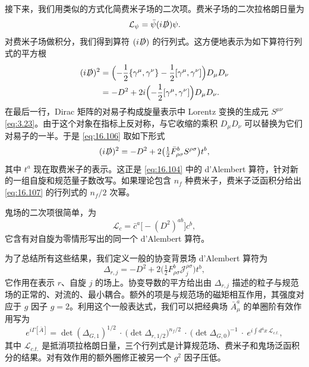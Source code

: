 接下来，我们用类似的方式化简费米子场的二次项。费米子场的二次拉格朗日量为
\begin{equation}
  \mathcal{L}_\psi = \bar{\psi}(i\slashed{D})\psi .
  \label{eq:16.105}
\end{equation}
对费米子场做积分，我们得到算符 $(i\slashed{D})$ 的行列式。这方便地表示为如下算符行列式的平方根
\begin{equation}
  \begin{aligned}
    (i\slashed{D})^2 &= \Bigl( -\frac{1}{2}\{ \gamma^\mu, \gamma^\nu \}
      - \frac{1}{2}[\gamma^\mu, \gamma^\nu] \Bigr)D_\mu D_\nu\\
    &= -D^2 + 2i\Bigl( -\frac{1}{2}[\gamma^\mu, \gamma^\nu] \Bigr)D_\mu D_\nu .
  \end{aligned}
  \label{eq:16.106}
\end{equation}
在最后一行，Dirac 矩阵的对易子构成旋量表示中 Lorentz 变换的生成元 $S^{\mu\nu}$ \eqref{eq:3.23}。由于这个对象在指标上反对称，与它收缩的乘积 $D_\mu D_\nu$ 可以替换为它们对易子的一半。于是 \eqref{eq:16.106} 取如下形式
\begin{equation}
  (i\slashed{D})^2 = -D^2 + 2\bigl( \tfrac{1}{2}\bar{F}^{b}_{\rho\sigma}
    S^{\rho\sigma} \bigr)t^b ,
  \label{eq:16.107}
\end{equation}
其中 $t^a$ 现在取费米子的表示。这正是 \eqref{eq:16.104} 中的 d'Alembert 算符，针对新的一组自旋和规范量子数改写。如果理论包含 $n_f$ 种费米子，费米子泛函积分给出 \eqref{eq:16.107} 的行列式的 $n_f/2$ 次幂。

鬼场的二次项很简单，为
\begin{equation}
  \mathcal{L}_c = \bar{c}^a\bigl[ -(D^2)^{ab} \bigr]c^b ,
  \label{eq:16.108}
\end{equation}
它含有对自旋为零情形写出的同一个 d'Alembert 算符。

为了总结所有这些结果，我们定义一般的协变背景场 d'Alembert 算符为
\begin{equation}
  \Delta_{r,j} = -D^2 + 2\bigl( \tfrac{1}{2}F^b_{\rho\sigma}
    \mathcal{J}^{\rho\sigma}_j \bigr)t^b ,
  \label{eq:16.109}
\end{equation}
它作用在表示 $r$、自旋 $j$ 的场上。协变导数的平方给出由 $\Delta_{r,j}$ 描述的粒子与规范场的正常的、对流的、最小耦合。额外的项是与规范场的磁矩相互作用，其强度对应于 $g$ 因子 $g = 2$。利用这个一般表达式，我们可以把经典场 $\bar{A}^a_\mu$ 的单圈阶有效作用写为
\begin{equation}
  e^{i\Gamma[\bar{A}]} = \det(\Delta_{G,1})^{1/2}\ \cdot\
    \bigl( \det\Delta_{r,1/2} \bigr)^{n_f/2}\ \cdot\
    \bigl( \det\Delta_{G,0} \bigr)^{-1}\ \cdot\ e^{i\int d^4x\
      \mathcal{L}_{c.t.}} ,
  \label{eq:16.110}
\end{equation}
其中 $\mathcal{L}_{c.t.}$ 是抵消项拉格朗日量，三个行列式是计算规范场、费米子和鬼场泛函积分的结果。对有效作用的额外圈修正被另一个 $g^2$ 因子压低。

